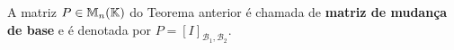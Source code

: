 \documentclass{beamer}
\begin{document}
    \begin{frame}
        \begin{definicao}
            A matriz $P \in \mathbb{M}_n(\mathbb{K})$ \pause do Teorema anterior \pause é chamada de \textbf{matriz de mudança de base} \pause e é
            denotada por $P = [I]_{{\mathcal{B}_1},{\mathcal{B}_2}}$.
        \end{definicao}
    \end{frame}

\end{document}
